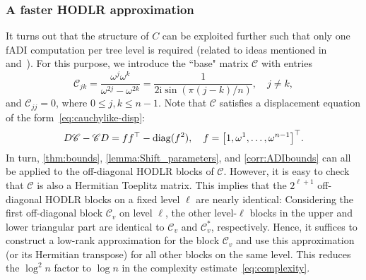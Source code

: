 \documentclass[final,reqno,onefignum,onetabnum]{siamart190516}
\begin{document}
\subsubsection{A faster HODLR approximation}

It turns out that the structure of $C$ can be exploited further such that only one fADI computation per tree level is required (related to ideas mentioned in~\cite[Sec. 4]{xia2012superfast} and~\cite{chandrasekaran2007superfast}). For this purpose, we introduce the ``base" matrix $\mathscr{C}$
with entries 
\[
\mathscr{C}_{jk} = \frac{\omega^j \omega^k}{\omega^{2j} - \omega^{2k}} = \frac{1}{2\mathrm{i} \sin( \pi (j-k)/n )}, \quad j \neq k,  
\]
and $\mathscr{C}_{jj} = 0$, where $0 \leq j, k \leq n\!-\!1$. 
Note that $\mathscr{C}$ satisfies a displacement equation of the form~\eqref{eq:cauchylike-disp}:
\begin{equation} \label{eq:cauchydisp}
  D \mathscr{C} - \mathscr{C} D = f f^{\top}- {\rm diag}(f^2), \quad f = \big[ 1, \omega^1, \ldots, \omega^{n-1} \big]^{\top}. 
\end{equation}
In turn, \cref{thm:bounds}, \cref{lemma:Shift_parameters}, and \cref{corr:ADIbounds} can all be applied to the off-diagonal HODLR blocks of $\mathscr{C}$. However, it is easy to check that $\mathscr{C}$ is also a Hermitian Toeplitz matrix.
This implies that the $2^{\ell+1}$ off-diagonal HODLR blocks on a fixed level $\ell$ are nearly identical: Considering the first off-diagonal block $\mathscr{C}_v$ on level $\ell$, the other level-$\ell$ blocks in the upper and lower triangular part are identical to $\mathscr{C}_v$ and ${\mathscr{C}_v^*}$, respectively. Hence, it suffices
to construct a low-rank approximation for the block $\mathscr{C}_{v}$ and use this approximation (or its Hermitian transpose) for all other blocks on the same level. This reduces the $\log^2\!n$ factor to $\log n$ in the complexity estimate~\eqref{eq:complexity}.
\end{document}
